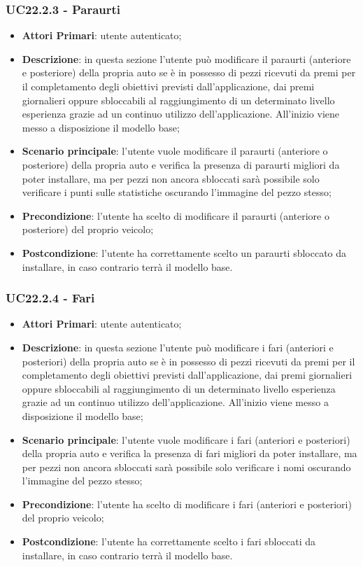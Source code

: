\subsubsection{UC22.2.3 - Paraurti}
\begin{itemize}
	\item \textbf{Attori Primari}: utente autenticato;
	\item \textbf{Descrizione}: in questa sezione l'utente può modificare il paraurti (anteriore e posteriore) della propria auto se è in possesso di pezzi ricevuti da premi per il completamento degli obiettivi previsti dall'applicazione, dai premi giornalieri oppure sbloccabili al raggiungimento di un determinato livello esperienza grazie ad un continuo utilizzo dell'applicazione.
	All'inizio viene messo a disposizione il modello base;
	\item \textbf{Scenario principale}: l'utente vuole modificare il paraurti (anteriore o posteriore) della propria auto e verifica la presenza di paraurti migliori da poter installare, ma per pezzi non ancora sbloccati sarà possibile solo verificare i punti sulle statistiche oscurando l'immagine del pezzo stesso;
	\item \textbf{Precondizione}: l'utente ha scelto di modificare il paraurti (anteriore o posteriore) del proprio veicolo; 
	\item \textbf{Postcondizione}: l'utente ha correttamente scelto un paraurti sbloccato da installare, in caso contrario terrà il modello base.
\end{itemize}
\subsubsection{UC22.2.4 - Fari}
\begin{itemize}
	\item \textbf{Attori Primari}: utente autenticato;
	\item \textbf{Descrizione}: in questa sezione l'utente può modificare i fari (anteriori e posteriori) della propria auto se è in possesso di pezzi ricevuti da premi per il completamento degli obiettivi previsti dall'applicazione, dai premi giornalieri oppure sbloccabili al raggiungimento di un determinato livello esperienza grazie ad un continuo utilizzo dell'applicazione. All'inizio viene messo a disposizione il modello base;
	\item \textbf{Scenario principale}: l'utente vuole modificare i fari (anteriori e posteriori) della propria auto e verifica la presenza di fari migliori da poter installare, ma per pezzi non ancora sbloccati sarà possibile solo verificare i nomi oscurando l'immagine del pezzo stesso;
	\item \textbf{Precondizione}: l'utente ha scelto di modificare i fari (anteriori e posteriori) del proprio veicolo; 
	\item \textbf{Postcondizione}: l'utente ha correttamente scelto i fari sbloccati da installare, in caso contrario terrà il modello base.
\end{itemize}
